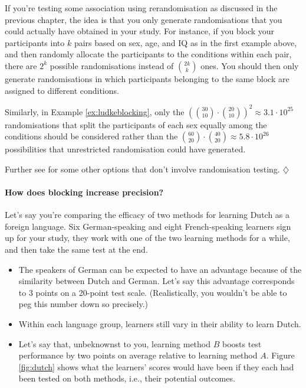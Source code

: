 \documentclass[a4paper]{tufte-book}\usepackage[]{graphicx}\usepackage[]{xcolor}
\newcommand*{\parend}[1][$\diamondsuit$]{%
  \unskip\nobreak\hspace{1em plus 1fill}$\diamondsuit$%
}
\begin{document}
If you're testing some association using rerandomisation
as discussed in the previous chapter, the idea is that you only
generate randomisations that you could actually have obtained in your study.
For instance, if you block your participants into $k$ pairs based on sex, age, and IQ
as in the first example above, and then randomly allocate the participants
to the conditions within each pair, there are $2^k$ possible randomisations
instead of ${2k} \choose k$ ones.
You should then only generate randomisations in which participants belonging
to the same block are assigned to different conditions.

Similarly, in Example \ref{ex:ludkeblocking},
only the $\left({{30} \choose {10}} \cdot {{20} \choose {10}}\right)^2 \approx 3.1 \cdot 10^{25}$
randomisations that split the participants
of each sex equally among the conditions should be considered
rather than the ${{60} \choose {20}} \cdot {{40} \choose {20}} \approx 5.8 \cdot 10^{26}$
possibilities that unrestricted randomisation could have generated.

 Further see \citet{Vanhove2015} for some other options that don't
 involve randomisation testing.
\parend

\paragraph{How does blocking increase precision?}
Let's say you're comparing the efficacy of two methods for learning Dutch
as a foreign language. Six German-speaking and eight French-speaking learners
sign up for your study, they work with one of the two learning methods for a while,
and then take the same test at the end.
\begin{itemize}
  \item The speakers of German can be expected to have
an advantage because of the similarity between Dutch and German. Let's say this
advantage corresponds to 3 points on a 20-point test scale. (Realistically,
you wouldn't be able to peg this number down so precisely.)

  \item Within each language group, learners still vary in their ability to
  learn Dutch.

  \item Let's say that, unbeknownst to you, learning method $B$ boosts
  test performance by two points on average relative to learning method $A$.
  Figure \ref{fig:dutch} shows what the learners' scores would have
  been if they each had been tested on both methods, i.e., their potential 
  outcomes.
\end{itemize}
\end{document}
